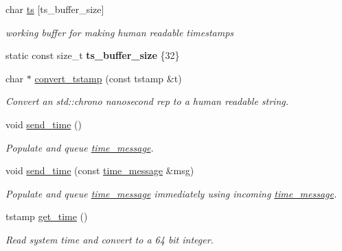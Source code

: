 \begin{DoxyCompactItemize}
char \mbox{\hyperlink{classaacio_1_1connection_ade26d696a65b9e41eeb04b3996db588b}{ts}} \mbox{[}ts\+\_\+buffer\+\_\+size\mbox{]}
\begin{DoxyCompactList}\small\item\em working buffer for making human readable timestamps \end{DoxyCompactList}\item 
\mbox{\label{classaacio_1_1connection_ac10cc4b661511f8f3587c6ab42699d57}} 
static const size\+\_\+t {\bfseries ts\+\_\+buffer\+\_\+size} \{32\}
\item 
\mbox{\label{classaacio_1_1connection_aedada486f2c82f88b92e76183eeb24dd}} 
char $\ast$ \mbox{\hyperlink{classaacio_1_1connection_aedada486f2c82f88b92e76183eeb24dd}{convert\+\_\+tstamp}} (const tstamp \&t)
\begin{DoxyCompactList}\small\item\em Convert an std\+::chrono nanosecond rep to a human readable string. \end{DoxyCompactList}\item 
\mbox{\label{classaacio_1_1connection_a351c243bf6561ca014de449f17442d39}} 
void \mbox{\hyperlink{classaacio_1_1connection_a351c243bf6561ca014de449f17442d39}{send\+\_\+time}} ()
\begin{DoxyCompactList}\small\item\em Populate and queue \mbox{\hyperlink{structaacio_1_1time__message}{time\+\_\+message}}. \end{DoxyCompactList}\item 
\mbox{\label{classaacio_1_1connection_a1f0e20917fb39d8abf0a69cf98586d4d}} 
void \mbox{\hyperlink{classaacio_1_1connection_a1f0e20917fb39d8abf0a69cf98586d4d}{send\+\_\+time}} (const \mbox{\hyperlink{structaacio_1_1time__message}{time\+\_\+message}} \&msg)
\begin{DoxyCompactList}\small\item\em Populate and queue \mbox{\hyperlink{structaacio_1_1time__message}{time\+\_\+message}} immediately using incoming \mbox{\hyperlink{structaacio_1_1time__message}{time\+\_\+message}}. \end{DoxyCompactList}\item 
tstamp \mbox{\hyperlink{classaacio_1_1connection_a4005241f51784d4b5f3de4b0fb57d31e}{get\+\_\+time}} ()
\begin{DoxyCompactList}\small\item\em Read system time and convert to a 64 bit integer. \end{DoxyCompactList}\end{DoxyCompactItemize}


